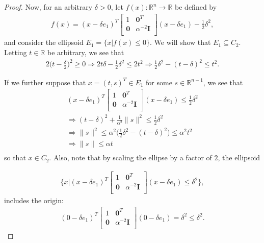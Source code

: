 \begin{proof}
Now, for an arbitrary $\delta > 0$, let 
$f(x): \mathbb R^n \to \mathbb R$ be defined by 
\begin{align*}
f(x) = (x - \delta e_1)^T\begin{bmatrix}
1 & \boldsymbol0^T \\
\boldsymbol 0 & \alpha^{-2} \boldsymbol I \\
\end{bmatrix}(x - \delta e_1) - \frac 1 2 \delta^2,
\end{align*} 
and consider the ellipsoid $E_1 = \{x | f(x) \le 0\}$.
We will show that $E_1 \subseteq C_2$.
Letting $t \in \mathbb R$ be arbitrary, we see that
\begin{align*}
2\big(t - \frac {\delta} 2\big)^2 \ge 0
\Longrightarrow 2t\delta - \frac 1 2 \delta^2 \le 2t^2 
\Longrightarrow \frac 1 2 \delta^2 - (t - \delta)^2 \le t^2. 
\end{align*}

If we further suppose that $x = (t, s)^T \in E_1$ for some $s \in \mathbb R^{n-1}$, we see that
\begin{align*}
(x - \delta e_1)^T\begin{bmatrix}
1 & \boldsymbol0^T \\
\boldsymbol 0 & \alpha^{-2} \boldsymbol I \\
\end{bmatrix}(x - \delta e_1) \le \frac 1 2 \delta^2 \\
\Longrightarrow (t - \delta)^2 + \frac {1} {\alpha^2} \|s\|^2 \le \frac 1 2 \delta^2 \\
\Longrightarrow \|s\|^2 \le \alpha^2 \big(\frac 1 2 \delta^2 - (t - \delta)^2\big) \le \alpha^2t^2\\
\Longrightarrow \|s\| \le \alpha t\\
\end{align*}
so that $x \in C_2$.
Also, note that by scaling the ellipse by a factor of $2$, the ellipsoid

\begin{align*}
\bigg \{x \bigg | (x - \delta e_1)^T\begin{bmatrix}
1 & \boldsymbol0^T \\
\boldsymbol 0 & \alpha^{-2} \boldsymbol I \\
\end{bmatrix}(x - \delta e_1) \le \delta^2 \bigg\},
\end{align*}
includes the origin:
\begin{align*}
(0 - \delta e_1)^T\begin{bmatrix}
1 & \boldsymbol0^T \\
\boldsymbol 0 & \alpha^{-2} \boldsymbol I \\
\end{bmatrix}(0 - \delta e_1) = \delta^2 \le \delta^2.
\end{align*}


\end{proof}
